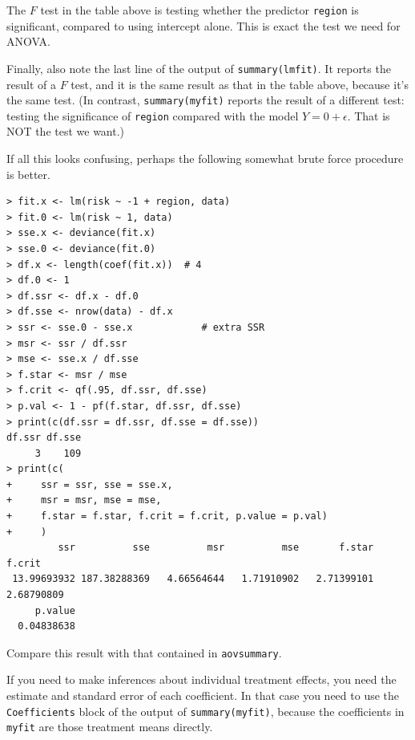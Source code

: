 \documentclass[12pt]{article}
\begin{document}
The $F$ test in the table above is testing whether
the predictor \verb+region+ is significant,
compared to using intercept alone.
This is exact the test we need for ANOVA.

Finally, also note the last line of the output of
\verb+summary(lmfit)+.
It reports the result of a $F$ test, and it is the same result as that
in the table above, because it's the same test.
(In contrast,
\verb+summary(myfit)+ reports the result of a different test:
testing the significance of \verb+region+
compared with the model $Y = 0 + \epsilon$.
That is NOT the test we want.)

If all this looks confusing, perhaps the following
somewhat brute force procedure is better.

\begin{verbatim}
> fit.x <- lm(risk ~ -1 + region, data)
> fit.0 <- lm(risk ~ 1, data)
> sse.x <- deviance(fit.x)
> sse.0 <- deviance(fit.0)
> df.x <- length(coef(fit.x))  # 4
> df.0 <- 1
> df.ssr <- df.x - df.0
> df.sse <- nrow(data) - df.x
> ssr <- sse.0 - sse.x            # extra SSR
> msr <- ssr / df.ssr
> mse <- sse.x / df.sse
> f.star <- msr / mse
> f.crit <- qf(.95, df.ssr, df.sse)
> p.val <- 1 - pf(f.star, df.ssr, df.sse)
> print(c(df.ssr = df.ssr, df.sse = df.sse))
df.ssr df.sse
     3    109
> print(c(
+     ssr = ssr, sse = sse.x,
+     msr = msr, mse = mse,
+     f.star = f.star, f.crit = f.crit, p.value = p.val)
+     )
         ssr          sse          msr          mse       f.star       f.crit 
 13.99693932 187.38288369   4.66564644   1.71910902   2.71399101   2.68790809 
     p.value 
  0.04838638 
\end{verbatim}

Compare this result with that contained in
\verb+aovsummary+.

If you need to make inferences about individual treatment effects,
you need the estimate and standard error of each coefficient.
In that case you need to use the \verb+Coefficients+ block
of the output of \verb+summary(myfit)+,
because the coefficients in \verb+myfit+ are those treatment
means directly.
\end{document}
